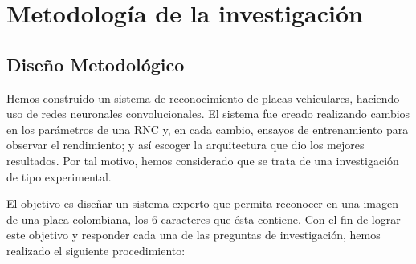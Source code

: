 
\chapter{Metodología de la investigación}
\section{Diseño Metodológico}
Hemos construido un sistema de reconocimiento de placas vehiculares, haciendo uso de redes neuronales convolucionales. El sistema fue creado realizando cambios en los parámetros de una RNC y, en cada cambio, ensayos de entrenamiento para observar el rendimiento; y así escoger la arquitectura que dio los mejores resultados. Por tal motivo, hemos considerado que se trata de una investigación de tipo experimental. 

El objetivo es diseñar un sistema experto que permita reconocer en una imagen de una placa colombiana, los 6 caracteres que ésta contiene. Con el fin de lograr este objetivo y responder cada una de las preguntas de investigación, hemos realizado el siguiente procedimiento:

